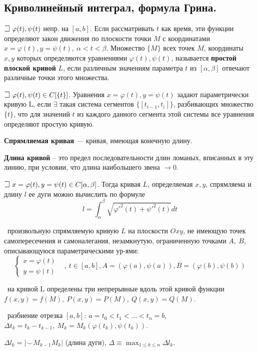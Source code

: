 \subsection{Криволинейный интеграл, формула Грина.}

$\mathLet ~ \varphi(t), \psi(t)$ непр. на $[a,b]$. 
Если рассматривать $t$ как время, эти функции определяют закон движения по плоскости точки $M$ с координатами 
$x = \varphi(t), y = \psi(t), ~ \alpha < t < \beta$. Множество $\{M\}$ всех точек $M$, координаты $x,y$ которых определяются уравнениями $\varphi(t), \psi(t)$, называется \textbf{простой плоской кривой} $L$, если различным значениям параметра $t$ из $[\alpha, \beta]$ отвечают различные точки этого множества.

$\mathLet ~ \varphi(t), \psi(t) \in C[\{t\}]$. Уравнения $x = \varphi(t), y = \psi(t)$ задают параметрически кривую L, если $\exists$ такая система сегментов $\{[t_{i-1}, t_i]\}$, разбивающих множество $\{t\}$, что для значений $t$ из каждого данного сегмента этой системы все уравнения определяют простую кривую.

\textbf{Спрямляемая кривая} --- кривая, имеющая конечную длину.

\textbf{Длина кривой} -- это предел последовательности длин ломаных, вписанных в эту линию, при условии, что длина наибольшего звена $\rightarrow 0$.

\bigbreak
$\mathLet ~ x = \varphi(t), y = \psi(t) \in C[\alpha, \beta]$. Тогда кривая $L$, определяемая $x, y$, спрямляема и длину $l$ ее дуги можно вычислить по формуле
$$l = \int^{\beta}_{\alpha} \sqrt{\varphi'^2(t) + \psi'^2(t)}dt$$

\faEye \ произвольную спрямляемую кривую $L$ на плоскости $Oxy$, не имеющую точек самопересечения и самоналегания, незамкнутую, ограниченную точками $A,~B$, описывающуюся параметрическими ур-ями:
$$\begin{cases} x=\varphi(t)&\\ y=\psi(t)\end{cases},~t\in [a,b], A=(\varphi(a),\psi(a)), B=(\varphi(b),\psi(b))$$

\mathLet \ на кривой L определены три непрерывные вдоль этой кривой функции $f(x,y)=f(M),~P(x,y)=P(M),~Q(x,y)=Q(M)$.

\faEye \ разбиение отрезка 
$[a,b]:~a=t_0 < t_1 < \dots < t_n = b,~$
$\Delta t_k = t_k-t_{k-1}, ~ M_k = M_k(\varphi(t_k),\psi(t_k))$.

$\Delta l_k = |\smile M_{k-1}M_k|$ (длина дуги), $\Delta \equiv \displaystyle\max_{1\leqslant k\leqslant n} \Delta l_k$.

